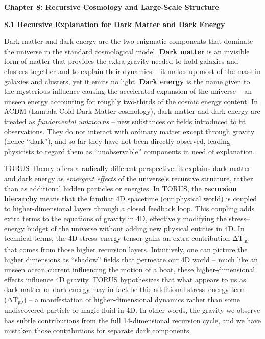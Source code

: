 \documentclass[]{article}
\date{}
\newcommand{\subscript}[1]{\ensuremath{_{\mathrm{#1}}}}
\begin{document}
\textbf{Chapter 8: Recursive Cosmology and Large-Scale Structure}

\textbf{8.1 Recursive Explanation for Dark Matter and Dark Energy}

Dark matter and dark energy are the two enigmatic components that
dominate the universe in the standard cosmological model. \textbf{Dark
matter} is an invisible form of matter that provides the extra gravity
needed to hold galaxies and clusters together and to explain their
dynamics -- it makes up most of the mass in galaxies and clusters, yet
it emits no light​. \textbf{Dark energy} is the name given to the
mysterious influence causing the accelerated expansion of the universe
-- an unseen energy accounting for roughly two-thirds of the cosmic
energy content. In ΛCDM (Lambda Cold Dark Matter cosmology), dark matter
and dark energy are treated as \emph{fundamental unknowns} -- new
substances or fields introduced to fit observations. They do not
interact with ordinary matter except through gravity (hence ``dark''),
and so far they have not been directly observed, leading physicists to
regard them as ``unobservable'' components in need of explanation.

TORUS Theory offers a radically different perspective: it explains dark
matter and dark energy as \emph{emergent effects} of the universe's
recursive structure, rather than as additional hidden particles or
energies. In TORUS, the \textbf{recursion hierarchy} means that the
familiar 4D spacetime (our physical world) is coupled to
higher-dimensional layers through a closed feedback loop. This coupling
adds extra terms to the equations of gravity in 4D, effectively
modifying the stress--energy budget of the universe without adding new
physical entities in 4D. In technical terms, the 4D stress--energy
tensor gains an extra contribution
ΔT\subscript{μν} that comes
from those higher recursion layers​. Intuitively, one can picture the
higher dimensions as ``shadow'' fields that permeate our 4D world --
much like an unseen ocean current influencing the motion of a boat,
these higher-dimensional effects influence 4D gravity. TORUS
hypothesizes that what appears to us as dark matter or dark energy may
in fact be this additional stress--energy term
(ΔT\subscript{μν}) -- a
manifestation of higher-dimensional dynamics rather than some
undiscovered particle or magic fluid in 4D​. In other words, the gravity
we observe has subtle contributions from the full 14-dimensional
recursion cycle, and we have mistaken those contributions for separate
dark components.
\end{document}
